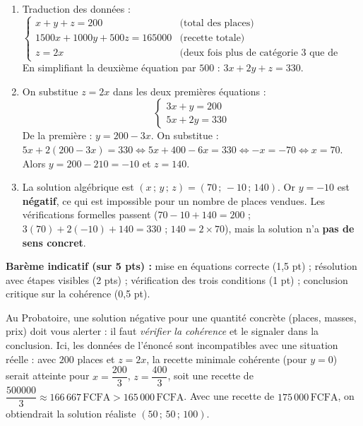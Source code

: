 \documentclass[11pt]{article}
\newcounter{popsec}
\newcounter{popsub}
\newcommand{\courssub}[1]{%
  \stepcounter{popsub}%
  \par\vspace{9pt}\noindent{\popxbold\fontsize{11.5}{13}\selectfont\color{popink}{\color{poporange}\thepopsec.\thepopsub}\hspace{6pt}#1}\par\nopagebreak\vspace{4pt}
}
\begin{document}
\courssub{Je me prépare au Probatoire}

\begin{corrige}
\begin{enumerate}
\item Traduction des données :
\[
\begin{cases}
x + y + z = 200 & \text{(total des places)} \\
1500x + 1000y + 500z = 165000 & \text{(recette totale)} \\
z = 2x & \text{(deux fois plus de catégorie 3 que de catégorie 1)}
\end{cases}
\]
En simplifiant la deuxième équation par $500$ : $3x + 2y + z = 330$.
\item On substitue $z = 2x$ dans les deux premières équations :
\[
\begin{cases} 3x + y = 200 \\ 5x + 2y = 330 \end{cases}
\]
De la première : $y = 200 - 3x$. On substitue : $5x + 2(200 - 3x) = 330 \iff 5x + 400 - 6x = 330 \iff -x = -70 \iff x = 70$. Alors $y = 200 - 210 = -10$ et $z = 140$.
\item La solution algébrique est $(x\,;\,y\,;\,z) = (70\,;\,-10\,;\,140)$. Or $y = -10$ est \textbf{négatif}, ce qui est impossible pour un nombre de places vendues. Les vérifications formelles passent ($70-10+140=200$ ; $3(70)+2(-10)+140=330$ ; $140=2\times70$), mais la solution n'a \textbf{pas de sens concret}.
\end{enumerate}
\textbf{Barème indicatif (sur 5 pts) :} mise en équations correcte (1,5 pt) ; résolution avec étapes visibles (2 pts) ; vérification des trois conditions (1 pt) ; conclusion critique sur la cohérence (0,5 pt).
\end{corrige}

\begin{attention}
Au Probatoire, une solution négative pour une quantité concrète (places, masses, prix) doit vous alerter : il faut \emph{vérifier la cohérence} et le signaler dans la conclusion. Ici, les données de l'énoncé sont incompatibles avec une situation réelle : avec $200$ places et $z=2x$, la recette minimale cohérente (pour $y=0$) serait atteinte pour $x=\dfrac{200}{3}$, $z=\dfrac{400}{3}$, soit une recette de $\dfrac{500000}{3} \approx 166\,667\,\text{FCFA} > 165\,000\,\text{FCFA}$. Avec une recette de $175\,000\,\text{FCFA}$, on obtiendrait la solution réaliste $(50\,;\,50\,;\,100)$.
\end{attention}
\end{document}

